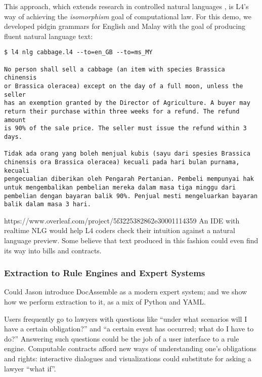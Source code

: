 \documentclass{IOS-Book-Article}
\begin{document}
This approach, which extends research in controlled natural languages \cite{fuchs_attempto_1996, angelov_implementing_2009}, is L4's way of achieving the \textit{isomorphism} goal \cite{bench-capon_isomorphism_2009} of computational law. For this demo, we developed pidgin grammars for English and Malay with the goal of producing fluent natural language text:

\begin{lstlisting}
$ l4 nlg cabbage.l4 --to=en_GB --to=ms_MY

No person shall sell a cabbage (an item with species Brassica chinensis
or Brassica oleracea) except on the day of a full moon, unless the seller
has an exemption granted by the Director of Agriculture. A buyer may
return their purchase within three weeks for a refund. The refund amount
is 90% of the sale price. The seller must issue the refund within 3 days.

Tidak ada orang yang boleh menjual kubis (sayu dari spesies Brassica
chinensis ora Brassica oleracea) kecuali pada hari bulan purnama, kecuali
pengecualian diberikan oleh Pengarah Pertanian. Pembeli mempunyai hak
untuk mengembalikan pembelian mereka dalam masa tiga minggu dari
pembelian dengan bayaran balik 90%. Penjual mesti mengeluarkan bayaran
balik dalam masa 3 hari.
\end{lstlisting}
https://www.overleaf.com/project/5f3225382862e30001114359
\noindent An IDE with realtime NLG would help L4 coders check their intuition against a natural language preview. Some believe that text produced in this fashion could even find its way into bills and contracts.

\subsubsection{Extraction to Rule Engines and Expert Systems}

Could Jason introduce DocAssemble as a modern expert system; and we show how we perform extraction to it, as a mix of Python and YAML.

Users frequently go to lawyers with questions like ``under what scenarios will I have a certain obligation?'' and ``a certain event has occurred; what do I have to do?'' Answering such questions could be the job of a user interface to a rule engine. Computable contracts \cite{surden_computable_2012} afford new ways of understanding one's obligations and rights: interactive dialogues and visualizations could substitute for asking a lawyer ``what if''.
\end{document}
